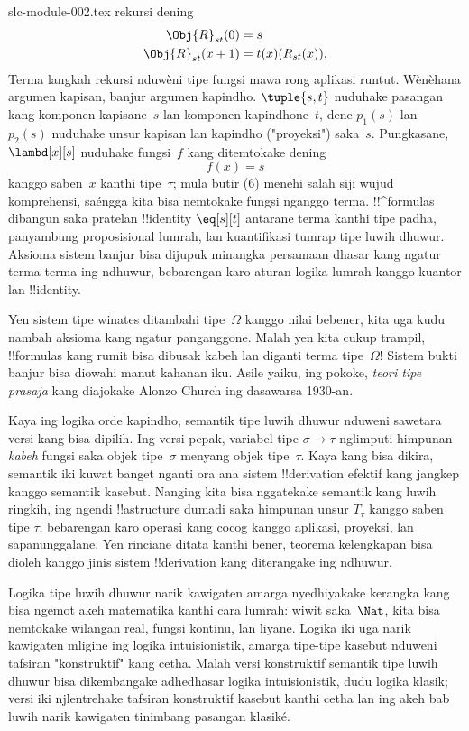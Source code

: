 \begin{filecontents*}[overwrite]{slc-module-002.tex}
rekursi dening
\begin{align*}
\Obj{R}_{st}(0) & = s \\
\Obj{R}_{st}(x+1) & = t(x)(R_{st}(x)),
\end{align*}
Terma langkah rekursi nduwèni tipe fungsi mawa rong aplikasi runtut. Wènèhana argumen kapisan, banjur argumen kapindho.
$\tuple{s, t}$ nuduhake pasangan kang
komponen kapisane~$s$ lan komponen kapindhone~$t$,
dene $p_1(s)$ lan~$p_2(s)$ nuduhake unsur
kapisan lan kapindho ("proyeksi") saka~$s$.
Pungkasane, $\lambd[x][s]$ nuduhake
fungsi~$f$ kang ditemtokake dening
\[
f(x) = s
\]
kanggo saben~$x$ kanthi tipe~$\tau$;
mula butir (6) menehi salah siji wujud
komprehensi, saéngga kita bisa nemtokake
fungsi nganggo terma.
!!^{formula}s dibangun saka pratelan !!{identity}
$\eq[s][t]$ antarane terma kanthi tipe padha,
panyambung proposisional lumrah, lan
kuantifikasi tumrap tipe luwih dhuwur.
Aksioma sistem banjur bisa dijupuk minangka
persamaan dhasar kang ngatur terma-terma ing
ndhuwur, bebarengan karo aturan logika
lumrah kanggo kuantor lan !!{identity}.

Yen sistem tipe winates ditambahi tipe~$\Omega$
kanggo nilai bebener, kita uga kudu nambah
aksioma kang ngatur panganggone. Malah yen
kita cukup trampil, !!{formula}s kang rumit
bisa dibusak kabeh lan diganti terma tipe~$\Omega$!{}
Sistem bukti banjur bisa diowahi
manut kahanan iku. Asile yaiku, ing pokoke,
\emph{teori tipe prasaja} kang diajokake
Alonzo Church ing dasawarsa 1930-an.

Kaya ing logika orde kapindho, semantik
tipe luwih dhuwur nduweni sawetara versi
kang bisa dipilih. Ing versi pepak,
variabel tipe $\sigma \to \tau$ nglimputi
himpunan \emph{kabeh} fungsi saka objek
tipe~$\sigma$ menyang objek tipe~$\tau$.
Kaya kang bisa dikira, semantik iki
kuwat banget nganti ora ana sistem
!!{derivation} efektif kang jangkep
kanggo semantik kasebut. Nanging kita
bisa nggatekake semantik kang luwih ringkih,
ing ngendi !!a{structure} dumadi saka
himpunan unsur $T_\tau$ kanggo saben tipe
$\tau$, bebarengan karo operasi kang
cocog kanggo aplikasi, proyeksi, lan
sapanunggalane. Yen rinciane ditata
kanthi bener, teorema kelengkapan
bisa dioleh kanggo jinis sistem
!!{derivation} kang diterangake ing ndhuwur.

Logika tipe luwih dhuwur narik kawigaten
amarga nyedhiyakake kerangka kang bisa
ngemot akeh matematika kanthi cara lumrah:
wiwit saka~$\Nat$, kita bisa nemtokake
wilangan real, fungsi kontinu, lan liyane.
Logika iki uga narik kawigaten mligine
ing logika intuisionistik, amarga tipe-tipe
kasebut nduweni tafsiran "konstruktif"
kang cetha. Malah versi konstruktif
semantik tipe luwih dhuwur bisa
dikembangake adhedhasar logika intuisionistik,
dudu logika klasik; versi iki njlentrehake
tafsiran konstruktif kasebut kanthi
cetha lan ing akeh bab luwih narik
kawigaten tinimbang pasangan klasiké.


\end{filecontents*}

